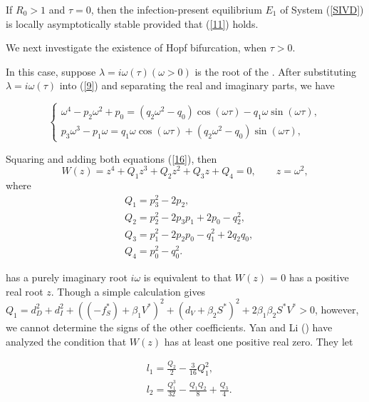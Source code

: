 \documentclass{CMHPhD-SIVD}
\begin{document}
 If $R_0 > 1$ and $\tau = 0$, then the infection-present equilibrium $E_1$ of System (\ref{SIVD}) is locally asymptotically stable provided that (\ref{11}) holds.


We next investigate the existence of Hopf bifurcation, when $\tau>0$.

In this case, suppose $\lambda= i\omega(\tau)(\omega > 0)$ is the root of the . After substituting $\lambda =i\omega(\tau)$ into (\ref{9}) and separating the real and imaginary parts, we have

\begin{equation}\label{16}
\left\{
   \begin{array}{ll}
    \omega^{4}-p_{2}\omega^{2}+p_0=(q_2 \omega^{2}-q_0)\cos(\omega\tau)-q_1 \omega \sin(\omega\tau),\\
    p_3 \omega^{3}-p_1 \omega=q_1 \omega \cos(\omega\tau)+ (q_2 \omega^{2}-q_0)\sin(\omega\tau),
   \end{array}
\right.
\end{equation}

Squaring and adding both equations (\ref{16}), then
\begin{equation}\label{17}
W(z)=z^4+Q_1 z^3+Q_2 z^2+Q_3 z+Q_4=0,  \qquad  z=\omega^2,
\end{equation}
where
\begin{align*}
&Q_1=p_3^2 - 2 p_2,\\
&Q_2=p_2^2 - 2 p_3 p_1 + 2 p_0 - q_2^2,\\
&Q_3=p_1^2 - 2 p_2 p_0 - q_1^2 + 2 q_2 q_0,\\
&Q_4=p_0^2 - q_0^2.
\end{align*}


 has a purely imaginary root $i \omega$ is equivalent to that $W(z)$ = 0 has a
positive real root $z$. Though a simple calculation gives $Q_1=d_D^2+d_I^2+\left(\left(-f_S^*\right)+\beta_1 V^*\right)^2+(d_V+\beta_2 S^*)^2+2 \beta_1 \beta_2 S^* V^* >0$, however, we cannot determine the signs of the other coefficients. Yan and Li (\cite{yan2006stability}) have analyzed the condition that $W(z)$ has at least one positive real zero. They let

\begin{align*}
&l_1=\frac{Q_2}{2}-\frac{3}{16}Q_1^2,\\
&l_2=\frac{Q_1^3}{32}-\frac{Q_1 Q_2}{8}+\frac{Q_3}{4}.
\end{align*}
\end{document}
